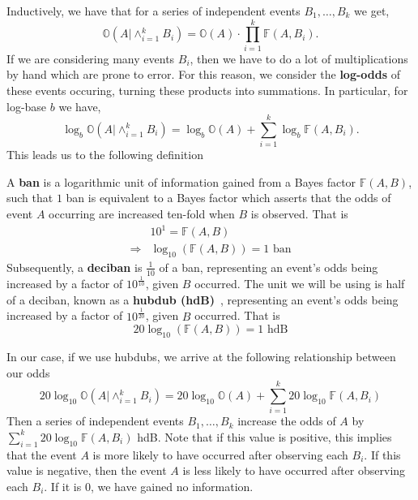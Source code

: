 \noindent Inductively, we have that for a series of independent
events $B_1, \dots, B_k$ we get,
\[
  \mathbb{O}(A|\wedge_{i=1}^k B_i) =
  \mathbb{O}(A)\cdot\prod_{i=1}^k{\mathbb{F}(A,B_i)}.
\]
If we are considering many events $B_i$, then we have to do a lot
of multiplications by hand which are prone to error. For this
reason, we consider the {\bf{log-odds}} of these events occuring,
turning these products into summations. In particular, for log-base $b$ we have,
\[
  \log_b\mathbb{O}(A|\wedge_{i=1}^k B_i) =
  \log_b\mathbb{O}(A)+\sum_{i=1}^k{\log_b\mathbb{F}(A,B_i)}.
\]
This leads us to the following definition
\begin{definition}
  A {\bf{ban}} is a logarithmic unit of information gained from a
  Bayes factor $\mathbb{F}(A,B)$, such that $1$ ban is equivalent to
  a Bayes factor which asserts that the odds of event $A$
  occurring are increased ten-fold when $B$ is observed. That is
  \begin{align*}
    & 10^1 = \mathbb{F}(A,B)                    \\
    \Rightarrow & \log_{10}(\mathbb{F}(A,B)) = 1\text{ ban}
  \end{align*}
  \noindent Subsequently, a {\bf{deciban}} is $\frac{1}{10}$ of a
  ban, representing an event's odds being increased by a factor of
  $10^\frac{1}{10}$, given $B$ occurred. The unit we will be using
  is half of a deciban, known as a {\bf{hubdub (hdB)}}~\cite[Section 4.1]{Hosgood2007},
  representing an event's odds being increased by a factor of
  $10^\frac{1}{20}$, given $B$ occurred. That is
  \[
    20\log_{10}(\mathbb{F}(A,B)) = 1\text{ hdB}
  \]
\end{definition}
\noindent In our case, if we use hubdubs, we arrive at the
following relationship between our odds
\[
  20\log_{10}\mathbb{O}(A|\wedge_{i=1}^k B_i) =
  20\log_{10}\mathbb{O}(A)+\sum_{i=1}^k{20\log_{10}\mathbb{F}(A,B_i)}
\]
Then a series of independent events $B_1, \dots, B_k$ increase the
odds of $A$ by  $\sum_{i=1}^k{20\log_{10}\mathbb{F}(A,B_i)}$ hdB.
Note that if this value is positive, this implies that the event $A$
is more likely to have occurred after observing each $B_i$. If this
value is negative, then the event $A$ is less likely to have
occurred after observing each $B_i$. If it is $0$, we have gained no
information.

